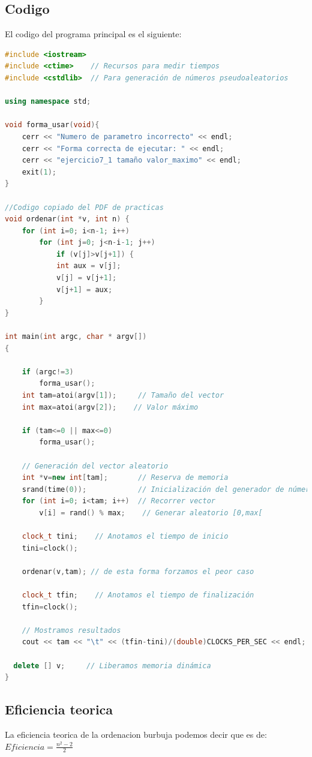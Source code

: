 \documentclass[12pt,a4psprt]{article}
\begin{document}
\subsection{Codigo}
El codigo del programa principal es el siguiente:
\begin{lstlisting}[language=C++]
#include <iostream>
#include <ctime>    // Recursos para medir tiempos
#include <cstdlib>  // Para generación de números pseudoaleatorios

using namespace std;

void forma_usar(void){
	cerr << "Numero de parametro incorrecto" << endl;
	cerr << "Forma correcta de ejecutar: " << endl;
	cerr << "ejercicio7_1 tamaño valor_maximo" << endl;
	exit(1);
}

//Codigo copiado del PDF de practicas
void ordenar(int *v, int n) {
	for (int i=0; i<n-1; i++)
		for (int j=0; j<n-i-1; j++)
			if (v[j]>v[j+1]) {
			int aux = v[j];
			v[j] = v[j+1];
			v[j+1] = aux;
		}
}

int main(int argc, char * argv[])
{
  
	if (argc!=3)
		forma_usar();
	int tam=atoi(argv[1]);     // Tamaño del vector
	int max=atoi(argv[2]);    // Valor máximo
	
	if (tam<=0 || max<=0)
    	forma_usar();
  
	// Generación del vector aleatorio
	int *v=new int[tam];       // Reserva de memoria
	srand(time(0));            // Inicialización del generador de números pseudoaleatorios
	for (int i=0; i<tam; i++)  // Recorrer vector
		v[i] = rand() % max;    // Generar aleatorio [0,max[

	clock_t tini;    // Anotamos el tiempo de inicio
	tini=clock();

	ordenar(v,tam); // de esta forma forzamos el peor caso
  
	clock_t tfin;    // Anotamos el tiempo de finalización
	tfin=clock();

	// Mostramos resultados
	cout << tam << "\t" << (tfin-tini)/(double)CLOCKS_PER_SEC << endl;
  
  delete [] v;     // Liberamos memoria dinámica
}
\end{lstlisting}
\subsection{Eficiencia teorica}
La eficiencia teorica de la ordenacion burbuja podemos decir que es de:\\
$Eficiencia=\frac{n^{2}-2}{2}$
\pagebreak
\end{document}
